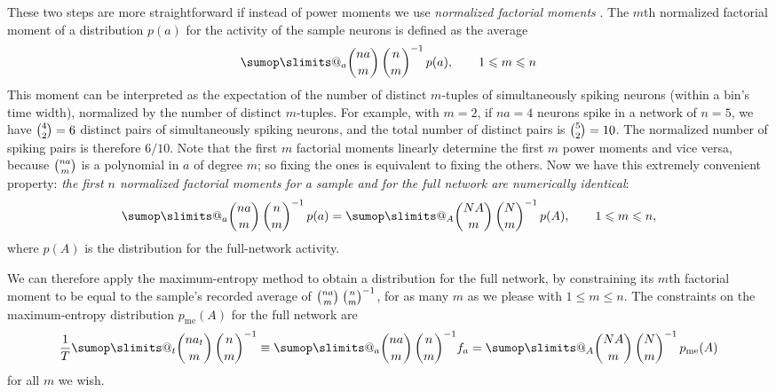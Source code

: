 \documentclass[\ifafour a4paper,12pt,\else a5paper,10pt,\fi%
onecolumn,oneside,article,%
british%
]{memoir}
\makeatletter
\theoremstyle{remark}
\theoremstyle{innote}
\def\sum{\DOTSI\sumop\slimits@}
\newcommand*{\citep}{\parencites}
\renewcommand*{\le}{\leqslant}%
\newcommand*{\E}{\mathrm{E}}
\renewcommand*{\|}{\nonscript\,\vert\nonscript\;\mathopen{}}
\newcommand*{\yAv}{A}
\newcommand*{\yav}{a}
\newcommand*{\yff}{f}
\newcommand*{\ya}{\yav}%
\newcommand*{\yA}{\yAv}%
\newcommand*{\yH}{\varIota}
\newcommand*{\px}{p_{\text{me}}}
\newcommand*{\pxx}{p}
\makeatother
\begin{document}
These two steps are more straightforward if instead of power moments we use
\emph{normalized factorial moments} \citep{potts1953}. The $m$th normalized
factorial moment of a distribution $\pxx(\ya)$ for the activity of the
sample neurons is defined as the average
\begin{equation}
  \sum_{\ya} %
  \binom{n \ya}{m}\,  \binom{n}{m}^{-1}\, \pxx(\ya),
  \qquad 1\le m \le n
\end{equation}
This moment can be interpreted as the expectation of the number of distinct
$m$-tuples of simultaneously spiking neurons (within a bin's time width),
normalized by the number of distinct $m$-tuples. For example, with $m=2$,
if $na=4$ neurons spike in a network of $n=5$, we have $\tbinom{4}{2}=6$
distinct pairs of simultaneously spiking neurons, and the total number of
distinct pairs is $\tbinom{5}{2}=10$. The normalized number of spiking
pairs is therefore $6/10$. Note that the first $m$ factorial moments
linearly determine the first $m$ power moments and vice versa, because
$\tbinom{n\ya}{m}$ is a polynomial in $\ya$ of degree $m$; so fixing the
ones is equivalent to fixing the others. Now we have this extremely
convenient property: \emph{the first $n$ normalized factorial moments for a
  sample and for the full network are numerically identical}:
\begin{equation}
  \label{eq:equal_m_factorialmoments}
    \sum_{\ya} %
  \binom{n \ya}{m}\,  \binom{n}{m}^{-1}\, \pxx(\ya)
=    \sum_{\yA} %
  \binom{N \yA}{m}\,  \binom{N}{m}^{-1}\, \pxx(\yA),
  \qquad 1\le m \le n,
\end{equation}
where $\pxx(\yA)$ is the distribution for the full-network activity.

We can therefore apply the maximum-entropy method to obtain a distribution
for the full network, by constraining its $m$th factorial moment to be
equal to the sample's recorded average of
$\tbinom{n\ya}{m}\;\tbinom{n}{m}^{-1}$, for as many $m$ as we please with
$1\le m \le n$. The constraints on the maximum-entropy distribution
$\px(\yA)$ for the full network are
\begin{equation}
  \label{eq:final_constraint}
  \frac{1}{T}\sum_{t}\binom{n\ya_{t}}{m}\,\binom{n}{m}^{-1}
  \equiv
   \sum_{\ya}
  \binom{n \ya}{m}\,  \binom{n}{m}^{-1} \yff_{\ya}
  =
   \sum_{\yA}
  \binom{N \yA}{m}\,  \binom{N}{m}^{-1}\, \px(\yA)
\end{equation}
for all $m$ we wish.
\end{document}
